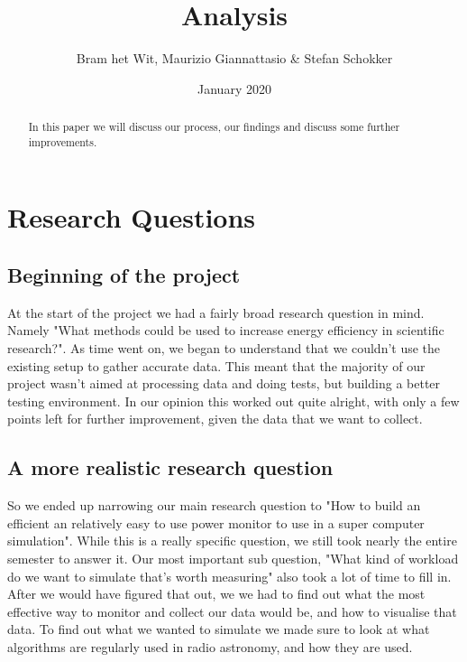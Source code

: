 \documentclass{article}
\title{Analysis}
\author{Bram het Wit, Maurizio Giannattasio \& Stefan Schokker}
\date{January 2020}
\begin{document}
\begin{titlepage}
	\maketitle
\end{titlepage}

\begin{abstract}
    In this paper we will discuss our process, our findings and discuss some further improvements. 
\end{abstract}

\tableofcontents
\listoffigures

\newpage

\section{Research Questions}
\subsection{Beginning of the project}
At the start of the project we had a fairly broad research question in mind. Namely "What methods could be used to increase energy efficiency in scientific research?". As time went on, we began to understand that we couldn't use the existing setup to gather accurate data. This meant that the majority of our project wasn't aimed at processing data and doing tests, but building a better testing environment. In our opinion this worked out quite alright, with only a few points left for further improvement, given the data that we want to collect.
\subsection{A more realistic research question}
So we ended up narrowing our main research question to "How to build an efficient an relatively easy to use power monitor to use in a super computer simulation". While this is a really specific question, we still took nearly the entire semester to answer it. Our most important sub question, "What kind of workload do we want to simulate that's worth measuring" also took a lot of time to fill in. After we would have figured that out, we we had to find out what the most effective way to monitor and collect our data would be, and how to visualise that data. To find out what we wanted to simulate we made sure to look at what algorithms are regularly used in radio astronomy, and how they are used.

\end{document}
